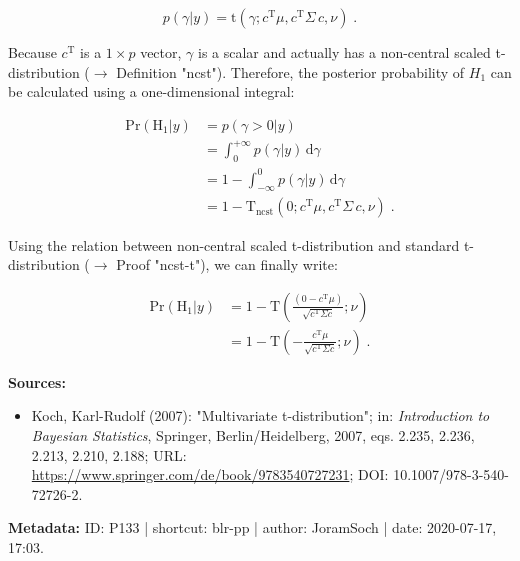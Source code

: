 \documentclass[a4paper,12pt,twoside]{book}
\begin{document}
\begin{equation} \label{eq:blr-pp-GLM-NG-post-gamma}
p(\gamma|y) = \mathrm{t}(\gamma; c^\mathrm{T} \mu, c^\mathrm{T} \Sigma \, c, \nu) \; .
\end{equation}

Because $c^\mathrm{T}$ is a $1 \times p$ vector, $\gamma$ is a scalar and actually has a non-central scaled t-distribution ($\rightarrow$ Definition "ncst"). Therefore, the posterior probability of $H_1$ can be calculated using a one-dimensional integral:

\begin{equation} \label{eq:blr-pp-GLM-NG-post-prob-H0-s1}
\begin{split}
\mathrm{Pr}\left( \mathrm{H}_1 | y \right) &= p(\gamma > 0|y) \\
&= \int_{0}^{+\infty} p(\gamma|y) \, \mathrm{d}\gamma \\
&= 1 - \int_{-\infty}^{0} p(\gamma|y) \, \mathrm{d}\gamma \\
&= 1 - \mathrm{T}_\mathrm{ncst}(0; c^\mathrm{T} \mu, c^\mathrm{T} \Sigma \, c, \nu) \; .
\end{split}
\end{equation}

Using the relation between non-central scaled t-distribution and standard t-distribution ($\rightarrow$ Proof "ncst-t"), we can finally write:

\begin{equation} \label{eq:blr-pp-GLM-NG-post-prob-H0-s2}
\begin{split}
\mathrm{Pr}\left( \mathrm{H}_1 | y \right) &= 1 - \mathrm{T}\left( \frac{(0 - c^\mathrm{T} \mu)}{\sqrt{c^\mathrm{T} \Sigma c}}; \nu \right) \\
&= 1 - \mathrm{T}\left( -\frac{c^\mathrm{T} \mu}{\sqrt{c^\mathrm{T} \Sigma c}}; \nu \right) \; .
\end{split}
\end{equation}


\vspace{1em}
\textbf{Sources:}
\begin{itemize}
\item Koch, Karl-Rudolf (2007): "Multivariate t-distribution"; in: \textit{Introduction to Bayesian Statistics}, Springer, Berlin/Heidelberg, 2007, eqs. 2.235, 2.236, 2.213, 2.210, 2.188; URL: \url{https://www.springer.com/de/book/9783540727231}; DOI: 10.1007/978-3-540-72726-2.
\end{itemize}


\vspace{1em}
\textbf{Metadata:} ID: P133 | shortcut: blr-pp | author: JoramSoch | date: 2020-07-17, 17:03.
\vspace{1em}
\end{document}
